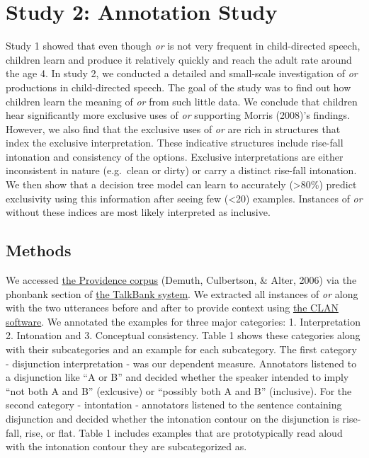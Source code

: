 \documentclass[10pt, letterpaper]{article}
\begin{document}
\section{Study 2: Annotation Study}\label{study-2-annotation-study}

Study 1 showed that even though \emph{or} is not very frequent in
child-directed speech, children learn and produce it relatively quickly
and reach the adult rate around the age 4. In study 2, we conducted a
detailed and small-scale investigation of \emph{or} productions in
child-directed speech. The goal of the study was to find out how
children learn the meaning of \emph{or} from such little data. We
conclude that children hear significantly more exclusive uses of
\emph{or} supporting Morris (2008)'s findings. However, we also find
that the exclusive uses of \emph{or} are rich in structures that index
the exclusive interpretation. These indicative structures include
rise-fall intonation and consistency of the options. Exclusive
interpretations are either inconsistent in nature (e.g.~clean or dirty)
or carry a distinct rise-fall intonation. We then show that a decision
tree model can learn to accurately (\textgreater{}80\%) predict
exclusivity using this information after seeing few (\textless{}20)
examples. Instances of \emph{or} without these indices are most likely
interpreted as inclusive.

\subsection{Methods}\label{methods-1}

We accessed
\href{https://phonbank.talkbank.org/browser/index.php?url=Eng-NA/Providence/}{the
Providence corpus} (Demuth, Culbertson, \& Alter, 2006) via the phonbank
section of \href{https://talkbank.org/}{the TalkBank system}. We
extracted all instances of \emph{or} along with the two utterances
before and after to provide context using
\href{http://alpha.talkbank.org/clan/}{the CLAN software}. We annotated
the examples for three major categories: 1. Interpretation 2. Intonation
and 3. Conceptual consistency. Table 1 shows these categories along with
their subcategories and an example for each subcategory. The first
category - disjunction interpretation - was our dependent measure.
Annotators listened to a disjunction like ``A or B'' and decided whether
the speaker intended to imply ``not both A and B'' (exlcusive) or
``possibly both A and B'' (inclusive). For the second category -
intontation - annotators listened to the sentence containing disjunction
and decided whether the intonation contour on the disjunction is
rise-fall, rise, or flat. Table 1 includes examples that are
prototypically read aloud with the intonation contour they are
subcategorized as.
\end{document}
